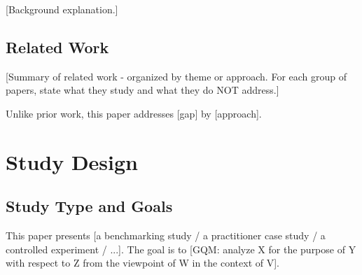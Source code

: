 \documentclass[11pt,a4paper]{article}
\begin{document}
[Background explanation.]

\subsection{Related Work}
\label{sec:related-work}

[Summary of related work - organized by theme or approach. For each group of papers, state what they study and what they do NOT address.]


Unlike prior work, this paper addresses [gap] by [approach].


\section{Study Design}
\label{sec:study-design}

\subsection{Study Type and Goals}

This paper presents [a benchmarking study / a practitioner case study / a controlled experiment / ...].
The goal is to [GQM: analyze X for the purpose of Y with respect to Z from the viewpoint of W in the context of V].
\end{document}
